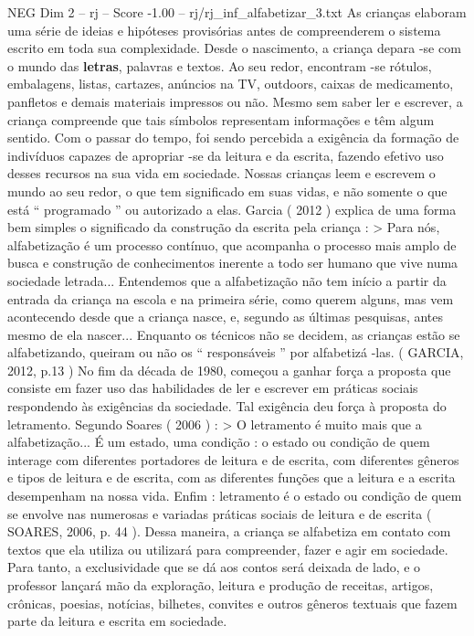 \begin{textsample}{NEG Dim 2 – rj – Score -1.00 – rj/rj\_inf\_alfabetizar\_3.txt}  \label{ex:f2_neg_053}
As crianças elaboram uma série de ideias e hipóteses provisórias antes de compreenderem o sistema escrito em toda sua complexidade.
Desde o nascimento, a criança depara -se com o mundo das \textbf{letras}, palavras e textos.
Ao seu redor, encontram -se rótulos, embalagens, listas, cartazes, anúncios na TV, outdoors, caixas de medicamento, panfletos e demais materiais impressos ou não.
Mesmo sem saber ler e escrever, a criança compreende que tais símbolos representam informações e têm algum sentido.
Com o passar do tempo, foi sendo percebida a exigência da formação de indivíduos capazes de apropriar -se da leitura e da escrita, fazendo efetivo uso desses recursos na sua vida em sociedade.
Nossas crianças leem e escrevem o mundo ao seu redor, o que tem significado em suas vidas, e não somente o que está “ programado ” ou autorizado a elas.
Garcia ( 2012 ) explica de uma forma bem simples o significado da construção da escrita pela criança : > Para nós, alfabetização é um processo contínuo, que acompanha o processo mais amplo de busca e construção de conhecimentos inerente a todo ser humano que vive numa sociedade letrada...
Entendemos que a alfabetização não tem início a partir da entrada da criança na escola e na primeira série, como querem alguns, mas vem acontecendo desde que a criança nasce, e, segundo as últimas pesquisas, antes mesmo de ela nascer...
Enquanto os técnicos não se decidem, as crianças estão se alfabetizando, queiram ou não os “ responsáveis ” por alfabetizá -las. ( GARCIA, 2012, p.13 ) No fim da década de 1980, começou a ganhar força a proposta que consiste em fazer uso das habilidades de ler e escrever em práticas sociais respondendo às exigências da sociedade.
Tal exigência deu força à proposta do letramento.
Segundo Soares ( 2006 ) : > O letramento é muito mais que a alfabetização...
É um estado, uma condição : o estado ou condição de quem interage com diferentes portadores de leitura e de escrita, com diferentes gêneros e tipos de leitura e de escrita, com as diferentes funções que a leitura e a escrita desempenham na nossa vida.
Enfim : letramento é o estado ou condição de quem se envolve nas numerosas e variadas práticas sociais de leitura e de escrita ( SOARES, 2006, p. 44 ).
Dessa maneira, a criança se alfabetiza em contato com textos que ela utiliza ou utilizará para compreender, fazer e agir em sociedade.
Para tanto, a exclusividade que se dá aos contos será deixada de lado, e o professor lançará mão da exploração, leitura e produção de receitas, artigos, crônicas, poesias, notícias, bilhetes, convites e outros gêneros textuais que fazem parte da leitura e escrita em sociedade.

\end{textsample}
